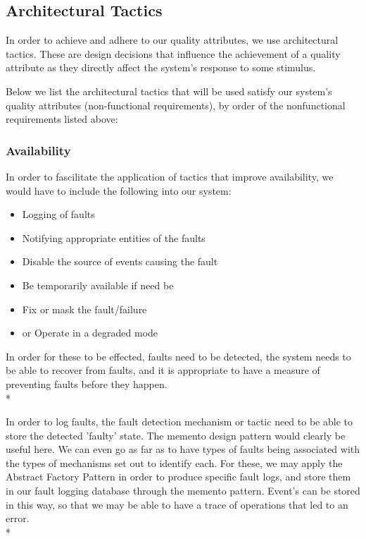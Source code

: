 \documentclass[11pt]{article}
\begin{document}
\subsection{Architectural Tactics}

In order to achieve and adhere to our quality attributes, we use architectural tactics. These are design decisions that influence the achievement of a quality attribute as they directly affect the system's response to some stimulus\cite{Book:2}.

Below we list the architectural tactics that will be used satisfy our system's quality attributes (non-functional requirements), by order of the nonfunctional requirements listed above:

\subsubsection{Availability}
In order to fascilitate the application of tactics that improve availability, we would have to include the following into our system:
\begin{itemize}
	\item[] Logging of faults
	\item[] Notifying appropriate entities of the faults
	\item[] Disable the source of events causing the fault
	\item[] Be temporarily available if need be
	\item[] Fix or mask the fault/failure
	\item[] or Operate in a degraded mode
\end{itemize}

In order for these to be effected, faults need to be detected, the system needs to be able to recover from faults, and it is appropriate to have a measure of preventing faults before they happen.\\*

In order to log faults, the fault detection mechanism or tactic need to be able to store the detected 'faulty' state. The memento design pattern would clearly be useful here. We can even go as far as to have types of faults being associated with the types of mechanisms set out to identify each. For these, we may apply the Abstract Factory Pattern in order to produce specific fault logs, and store them in our fault logging database through the memento pattern. Event's can be stored in this way, so that we may be able to have a trace of operations that led to an error.\\*
\end{document}
